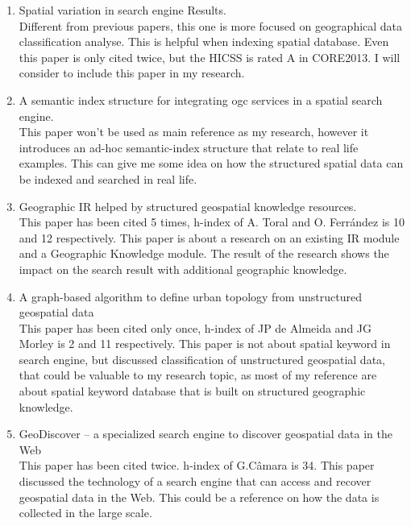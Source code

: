 \documentclass[a4paper,11pt]{article}
\begin{document}
\begin{enumerate}
\item Spatial variation in search engine Results.\cite{ref6} \\ Different from previous papers, this one is more focused on geographical data classification analyse. This is helpful when indexing spatial database. Even this paper is only cited twice, but the HICSS is rated A in CORE2013. I will consider to include this paper in my research.

\item A semantic index structure for integrating ogc services in a spatial search engine.\cite{ref7} \\ This paper won’t be used as main reference as my research, however it introduces an ad-hoc semantic-index structure that relate to real life examples.  This can give me some idea on how the structured spatial data can be indexed and searched in real life.

\item Geographic IR helped by structured geospatial knowledge resources.\cite{ref8} \\ This paper has been cited 5 times, h-index of A. Toral and O. Ferrández is 10 and 12 respectively. This paper is about a research on an existing IR module and a Geographic Knowledge module. The result of the research shows the impact on the search result with additional geographic knowledge.

\item A graph-based algorithm to define urban topology from unstructured geospatial data\cite{ref9} \\ This paper has been cited only once, h-index of JP de Almeida and JG Morley is 2 and 11 respectively. This paper is not about spatial keyword in search engine, but discussed classification of unstructured geospatial data, that could be valuable to my research topic, as most of my reference are about spatial keyword database that is built on structured geographic knowledge.

\item GeoDiscover – a specialized search engine to discover geospatial data in the Web\cite{ref10} \\ This paper has been cited twice. h-index of G.Câmara is 34. This paper discussed the technology of a search engine that can access and recover geospatial data in the Web. This could be a reference on how the data is collected in the large scale.

\end{enumerate}



\end{document}
